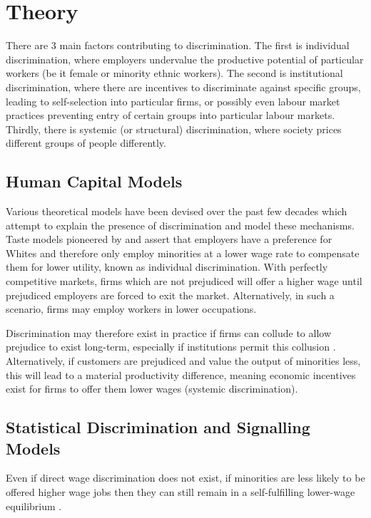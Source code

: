 \documentclass[class=article, crop=false]{standalone}
\begin{document}
\section{Theory}
\label{sec:Theory}
There are 3 main factors contributing to discrimination. The first is individual discrimination, where employers undervalue the productive potential of particular workers (be it female or minority ethnic workers). The second is institutional discrimination, where there are incentives to discriminate against specific groups, leading to self-selection into particular firms, or possibly even labour market practices preventing entry of certain groups into particular labour markets. Thirdly, there is systemic (or structural) discrimination, where society prices different groups of people differently.

\subsection{Human Capital Models}
\label{sec:Human Capital Models}
Various theoretical models have been devised over the past few decades which attempt to explain the presence of discrimination and model these mechanisms. Taste models pioneered by \citet{Becker} and \citet{Arrow} assert that employers have a preference for Whites and therefore only employ minorities at a lower wage rate to compensate them for lower utility, known as individual discrimination. With perfectly competitive markets, firms which are not prejudiced will offer a higher wage until prejudiced employers are forced to exit the market. Alternatively, in such a scenario, firms may employ workers in lower occupations.

Discrimination may therefore exist in practice if firms can collude to allow prejudice to exist long-term, especially if institutions permit this collusion \citep{LundbergB}. Alternatively, if customers are prejudiced and value the output of minorities less, this will lead to a material productivity difference, meaning economic incentives exist for firms to offer them lower wages (systemic discrimination).

\subsection{Statistical Discrimination and Signalling Models}
\label{sec:Stat_discrim and signalling}
Even if direct wage discrimination does not exist, if minorities are less likely to be offered higher wage jobs then they can still remain in a self-fulfilling lower-wage equilibrium \citep{Coate}.
\end{document}
